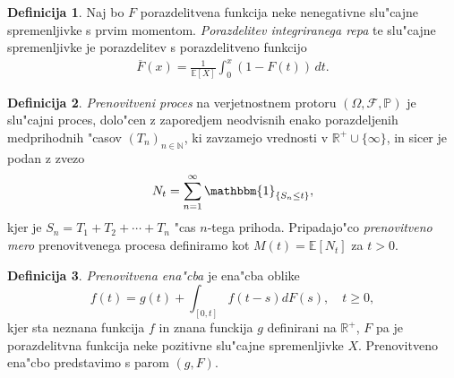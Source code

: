 \documentclass[12pt, a4paper, reqno]{amsart}
\theoremstyle{definition}
\newtheorem{definicija}{Definicija}[section]
\theoremstyle{plain}
\newcommand{\R}{\mathbb{R}}
\newcommand{\N}{\mathbb{N}}
\newcommand{\E}{\mathbb{E}}
\newcommand{\Prob}{\mathbb{P}}
\newcommand{\1}{\mathds{1}}
\begin{document}
    \begin{definicija}
        Naj bo $F$ porazdelitvena funkcija neke nenegativne slu"cajne spremenljivke s prvim 
        momentom. \textit{Porazdelitev integriranega repa} te slu"cajne spremenljivke je porazdelitev
        s porazdelitveno funkcijo
        \begin{align*}
            \overline{F}(x) = \frac{1}{\mathbb{E}[X]} \int_0^x (1 - F(t)) \, dt.
        \end{align*}

        \label{def:porazdelitevintegriranegaRepa}
    \end{definicija}

    \begin{definicija}
        \textit{Prenovitveni proces} na verjetnostnem protoru $(\Omega, \mathcal{F}, \Prob)$ je slu"cajni 
        proces,
        dolo"cen z zaporedjem neodvisnih enako porazdeljenih medprihodnih "casov $(T_n)_{n\in\N}$, 
        ki zavzamejo vrednosti v $\R^+\cup\{\infty\}$, in sicer je podan z zvezo 
        \begin{equation*}
            N_t = \sum_{n=1}^{\infty}\mathbbm{1}_{\{S_n\leq t\}},
        \end{equation*}
        kjer je $S_n = T_1 + T_2 + \cdots + T_n$ "cas $n$-tega prihoda. Pripadajo"co 
        \textit{prenovitveno mero} prenovitvenega procesa definiramo kot $M(t) = \E\left[N_t\right]$ za 
        $t > 0$.
        \label{def:PrenovitveniProces}
    \end{definicija}

    \begin{definicija}
        \textit{Prenovitvena ena"cba} je ena"cba oblike 
        \begin{equation*}
            f(t) = g(t) + \int_{[0, t]}f(t - s)dF(s), \quad t\geq 0,
        \end{equation*}
        kjer sta neznana funkcija $f$ in znana funckija $g$ definirani na $\R^+$, $F$ pa je 
        porazdelitvna funkcija neke pozitivne slu"cajne spremenljivke $X$. Prenovitveno ena"cbo predstavimo
        s parom $(g, F)$.
        \label{def:prenovitvenaEnacba}
    \end{definicija}
\end{document}
